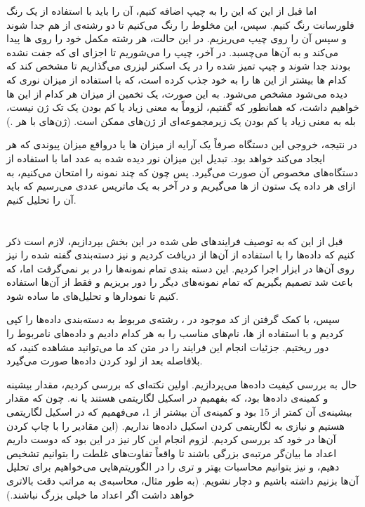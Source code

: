 \documentclass[12pt,onecolumn,a4paper]{article}
\begin{document}
اما قبل از این که این  را به چیپ اضافه کنیم، آن را باید با استفاده از یک رنگ فلورسانت رنگ کنیم. سپس، این مخلوط را رنگ می‌کنیم تا دو رشته‌ی  از هم جدا شوند و سپس آن را روی چیپ می‌ریزیم. در این حالت، هر رشته مکمل خود را روی ها پیدا می‌کند و به آن‌ها می‌چسبد. در آخر، چیپ را می‌شوریم تا اجزای ای که جفت نشده بودند جدا شوند و چیپ تمیز شده را در یک اسکنر لیزری می‌گذاریم تا مشخص کند که کدام ها بیشتر از این ها را به خود جذب کرده است، که با استفاده از میزان نوری که دیده می‌شود مشخص می‌شود. به این صورت، یک تخمین از میزان  هر کدام از این ها خواهیم داشت، که همانطور که گفتیم، لزوماً به معنی زیاد یا کم بودن یک تک ژن نیست، بله به معنی زیاد یا کم بودن یک زیرمجموعه‌ای از ژن‌های ممکن است. (ژن‌های  با هر .)

در نتیجه، خروجی این دستگاه صرفاً یک آرایه از میزان ها یا درواقع میزان پیوندی که هر  ایجاد می‌کند خواهد بود. تبدیل این میزان نور دیده شده به عدد اما با استفاده از دستگاه‌های مخصوص آن صورت می‌گیرد. پس چون که چند نمونه را امتحان می‌کنیم، به ازای هر داده یک ستون از ها می‌گیریم و در آخر به یک ماتریس عددی می‌رسیم که باید آن را تحلیل کنیم.

\section{}
قبل از این که به توصیف فرایندهای طی شده در این بخش بپردازیم، لازم است ذکر کنیم که داده‌ها را با استفاده از  آن‌ها از  دریافت کردیم و نیز دسته‌بندی گفته شده را نیز روی آن‌ها در ابزار  اجرا کردیم. این دسته بندی تمام نمونه‌ها را در بر نمی‌گرفت اما، که باعث شد تصمیم بگیریم که تمام نمونه‌های دیگر را دور بریزیم و فقط از آن‌ها استفاده کنیم تا نمودار‌ها و تحلیل‌های ما ساده شود.

سپس، با کمک گرفتن از کد موجود در ، رشته‌ی مربوط به دسته‌بندی داده‌ها را کپی کردیم و با استفاده از ها، نام‌های مناسب را به هر کدام دادیم و داده‌های نامربوط را دور ریختیم. جزئیات انجام این فرایند را در متن کد ما می‌توانید مشاهده کنید، که بلافاصله بعد از لود کردن داده‌ها صورت می‌گیرد.

حال به بررسی کیفیت داده‌ها می‌پردازیم. اولین نکته‌ای که بررسی کردیم، مقدار بیشینه و کمینه‌ی داده‌ها بود، که بفهمیم در اسکیل لگاریتمی هستند یا نه. چون که مقدار بیشینه‌ی آن کمتر از 15 بود و کمینه‌ی آن بیشتر از 1، می‌فهمیم که در اسکیل لگاریتمی هستیم و نیازی به لگاریتمی کردن اسکیل داده‌ها نداریم. (این مقادیر را با چاپ کردن آن‌ها در خود کد  بررسی کردیم. لزوم انجام این کار نیز در این بود که دوست داریم اعداد ما بیان‌گر مرتبه‌ی بزرگی باشند تا واقعاً تفاوت‌های غلطت را بتوانیم تشخیص دهیم، و نیز بتوانیم محاسبات بهتر و تری را در الگوریتم‌هایی می‌خواهیم برای تحلیل آن‌ها بزنیم داشته باشیم و دچار  نشویم. (به طور مثال، محاسبه‌ی  به مراتب دقت بالاتری خواهد داشت اگر اعداد ما خیلی بزرگ نباشند.)
\end{document}

